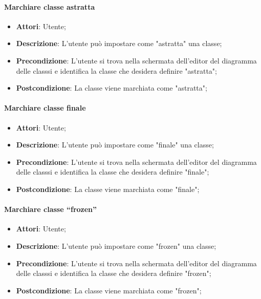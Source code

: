 \paragraph{Marchiare classe astratta}
\begin{itemize}
	\item \textbf{Attori}: Utente;
	\item \textbf{Descrizione}: L'utente può impostare come "astratta" una classe;
	\item \textbf{Precondizione}: L’utente si trova nella schermata dell’editor del diagramma delle classsi e identifica la classe che desidera definire "astratta";
	\item \textbf{Postcondizione}: La classe viene marchiata come "astratta";
\end{itemize}

\paragraph{Marchiare classe finale}
\begin{itemize}
	\item \textbf{Attori}: Utente;
	\item \textbf{Descrizione}: L'utente può impostare come "finale" una classe;
	\item \textbf{Precondizione}: L’utente si trova nella schermata dell’editor del diagramma delle classsi e identifica la classe che desidera definire "finale";
	\item \textbf{Postcondizione}: La classe viene marchiata come "finale";
\end{itemize}

\paragraph{Marchiare classe “frozen”}
\begin{itemize}
	\item \textbf{Attori}: Utente;
	\item \textbf{Descrizione}: L'utente può impostare come "frozen" una classe;
	\item \textbf{Precondizione}: L’utente si trova nella schermata dell’editor del diagramma delle classsi e identifica la classe che desidera definire "frozen";
	\item \textbf{Postcondizione}: La classe viene marchiata come "frozen";
\end{itemize}

